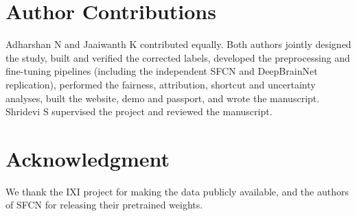\documentclass[conference]{IEEEtran}
\begin{document}
\section*{Author Contributions}
Adharshan N and Jaaiwanth K contributed equally. Both authors jointly designed the study, built and verified the corrected labels, developed the preprocessing and fine-tuning pipelines (including the independent SFCN and DeepBrainNet replication), performed the fairness, attribution, shortcut and uncertainty analyses, built the website, demo and passport, and wrote the manuscript. Shridevi S supervised the project and reviewed the manuscript.

\section*{Acknowledgment}
We thank the IXI project for making the data publicly available, and the authors of SFCN for releasing their pretrained weights.



\end{document}
